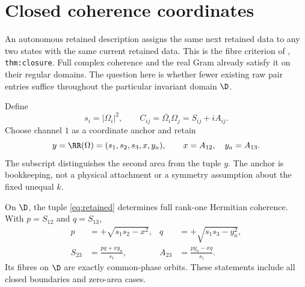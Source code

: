 \section{Closed coherence coordinates}\label{sec:coordinates}

An autonomous retained description assigns the same next retained data to any two states with the same current retained data. This is the fibre criterion of \cite{nrg}, \texttt{thm:closure}. Full complex coherence and the real Gram already satisfy it on their regular domains. The question here is whether fewer existing raw pair entries suffice throughout the particular invariant domain \(\D\).

Define
\begin{equation}
s_i=|\Omega_i|^2,\qquad
C_{ij}=\overline{\Omega_i}\Omega_j=S_{ij}+iA_{ij}.
\label{eq:pairs}
\end{equation}
Choose channel \(1\) as a coordinate anchor and retain
\begin{equation}
y=\RR(\Omega)=(s_1,s_2,s_3,x,y_a),\qquad
x=A_{12},\quad y_a=A_{13}.
\label{eq:retained}
\end{equation}
The subscript distinguishes the second area from the tuple \(y\). The anchor is bookkeeping, not a physical attachment or a symmetry assumption about the fixed unequal \(k\).

\begin{theorem}\label{thm:reconstruction}
On \(\D\), the tuple \eqref{eq:retained} determines full rank-one Hermitian coherence. With \(p=S_{12}\) and \(q=S_{13}\),
\begin{align}
p&=+\sqrt{s_1s_2-x^2},&
q&=+\sqrt{s_1s_3-y_a^2},\label{eq:roots}\\
S_{23}&=\frac{pq+xy_a}{s_1},&
A_{23}&=\frac{py_a-xq}{s_1}.
\label{eq:thirdpair}
\end{align}
Its fibres on \(\D\) are exactly common-phase orbits. These statements include all closed boundaries and zero-area cases.
\end{theorem}

